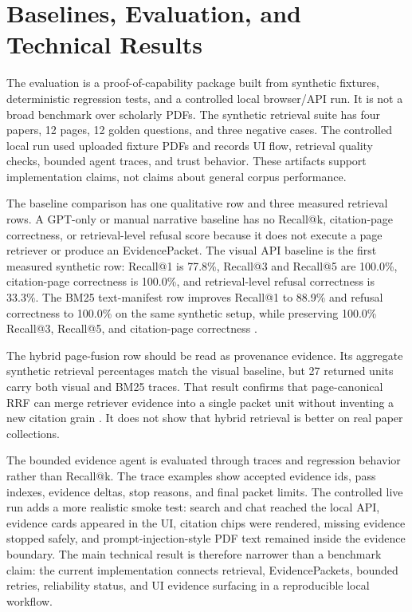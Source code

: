 \section{Baselines, Evaluation, and Technical Results}

The evaluation is a proof-of-capability package built from synthetic fixtures, deterministic regression tests, and a controlled local browser/API run. It is not a broad benchmark over scholarly PDFs. The synthetic retrieval suite has four papers, 12 pages, 12 golden questions, and three negative cases. The controlled local run used uploaded fixture PDFs and records UI flow, retrieval quality checks, bounded agent traces, and trust behavior. These artifacts support implementation claims, not claims about general corpus performance.



The baseline comparison has one qualitative row and three measured retrieval rows. A GPT-only or manual narrative baseline has no Recall@k, citation-page correctness, or retrieval-level refusal score because it does not execute a page retriever or produce an EvidencePacket. The visual API baseline is the first measured synthetic row: Recall@1 is 77.8\%, Recall@3 and Recall@5 are 100.0\%, citation-page correctness is 100.0\%, and retrieval-level refusal correctness is 33.3\%. The BM25 text-manifest row improves Recall@1 to 88.9\% and refusal correctness to 100.0\% on the same synthetic setup, while preserving 100.0\% Recall@3, Recall@5, and citation-page correctness \citep{paperMemoryNode1,paperMemoryBm25Metrics}.

The hybrid page-fusion row should be read as provenance evidence. Its aggregate synthetic retrieval percentages match the visual baseline, but 27 returned units carry both visual and BM25 traces. That result confirms that page-canonical RRF can merge retriever evidence into a single packet unit without inventing a new citation grain \citep{paperMemoryHybridMetrics}. It does not show that hybrid retrieval is better on real paper collections.

The bounded evidence agent is evaluated through traces and regression behavior rather than Recall@k. The trace examples show accepted evidence ids, pass indexes, evidence deltas, stop reasons, and final packet limits. The controlled live run adds a more realistic smoke test: search and chat reached the local API, evidence cards appeared in the UI, citation chips were rendered, missing evidence stopped safely, and prompt-injection-style PDF text remained inside the evidence boundary. The main technical result is therefore narrower than a benchmark claim: the current implementation connects retrieval, EvidencePackets, bounded retries, reliability status, and UI evidence surfacing in a reproducible local workflow.
